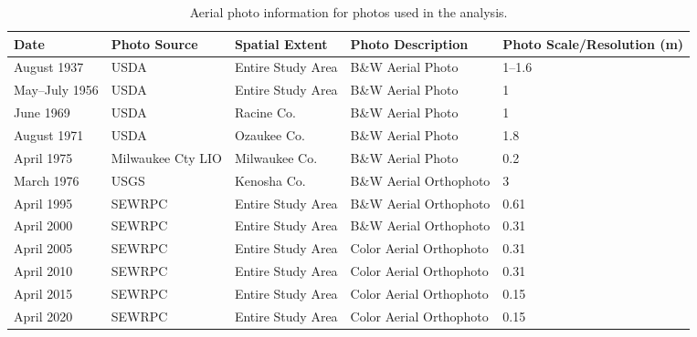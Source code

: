 \begin{table}[ht]
  \centering
  \footnotesize
  \setlength{\tabcolsep}{4pt} %
  \renewcommand{\arraystretch}{1.2} %
  \begin{tabularx}{\textwidth}{l l l X p{2cm}}
    \toprule
    \textbf{Date} & \textbf{Photo Source} & \textbf{Spatial Extent} & \textbf{Photo Description} & \textbf{Photo Scale/Resolution (m)} \\
    \midrule
    August 1937   & USDA            & Entire Study Area & B\&W Aerial Photo       & 1--1.6 \\
    May--July 1956 & USDA           & Entire Study Area & B\&W Aerial Photo       & 1 \\
    June 1969     & USDA            & Racine Co.        & B\&W Aerial Photo       & 1 \\
    August 1971   & USDA            & Ozaukee Co.       & B\&W Aerial Photo       & 1.8 \\
    April 1975    & Milwaukee Cty LIO & Milwaukee Co.   & B\&W Aerial Photo       & 0.2 \\
    March 1976    & USGS            & Kenosha Co.       & B\&W Aerial Orthophoto  & 3 \\
    April 1995    & SEWRPC          & Entire Study Area & B\&W Aerial Orthophoto  & 0.61 \\
    April 2000    & SEWRPC          & Entire Study Area & B\&W Aerial Orthophoto  & 0.31 \\
    April 2005    & SEWRPC          & Entire Study Area & Color Aerial Orthophoto & 0.31 \\
    April 2010    & SEWRPC          & Entire Study Area & Color Aerial Orthophoto & 0.31 \\
    April 2015    & SEWRPC          & Entire Study Area & Color Aerial Orthophoto & 0.15 \\
    April 2020    & SEWRPC          & Entire Study Area & Color Aerial Orthophoto & 0.15 \\
    \bottomrule
  \end{tabularx}
  \caption{Aerial photo information for photos used in the analysis.}
  \label{tab:tab2.2}
\end{table}
